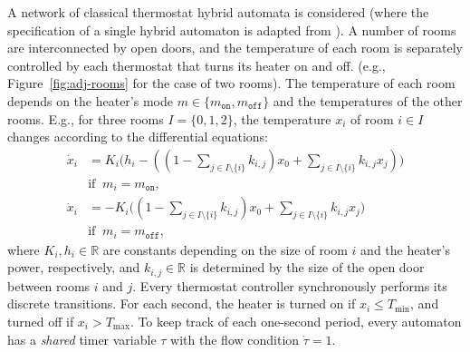 A network of classical thermostat hybrid automata is considered 
(where the specification of a single hybrid automaton is adapted from \cite{henzinger2000theory}). 
A number of rooms are interconnected by open doors,
and the temperature of each room is separately controlled by each thermostat
that turns its heater on and off.
(e.g., Figure~\ref{fig:adj-rooms}  for the case of two rooms).
The temperature of each room depends on
the heater's mode $m \in \{m_\texttt{on}, m_\texttt{off}\}$  and the temperatures of the other rooms.
E.g., for three rooms $I = \{0,1,2\}$, 
the temperature $x_i$ of room $i \in I$
changes according to the differential equations:
\[
\begin{aligned}
\dot{x}_i &= K_i \big(h_i - ((1- \textstyle\sum_{j \in I \setminus \{i\}} k_{i,j}) x_0 + \sum_{j \in I \setminus \{i\}} k_{i,j}  x_j)\big)
\\ 
&\mbox{if}\;\; m_i = m_\texttt{on},
\\
\dot{x}_i &= - K_i \big((1- \textstyle\sum_{j \in I \setminus \{i\}} k_{i,j}) x_0 + \sum_{j \in I \setminus \{i\}} k_{i,j}  x_j\big)
\\
& \mbox{if}\;\; m_i = m_\texttt{off},
\end{aligned}
\]
where $K_i, h_i \in \mathbb{R}$ are constants depending on
the size of room $i$ and the heater's power, respectively,
and $k_{i,j} \in \mathbb{R}$ is determined by the size of the open door between rooms $i$ and $j$.
%
Every thermostat controller synchronously performs its discrete transitions.
For each second, 
the heater is turned on if $x_i \leq T_{\min}$,
and turned off if $x_i > T_{\max}$.
To keep track of each one-second period,
every automaton has a \emph{shared} timer variable $\tau$ 
with the flow condition $\dot{\tau} = 1$.



